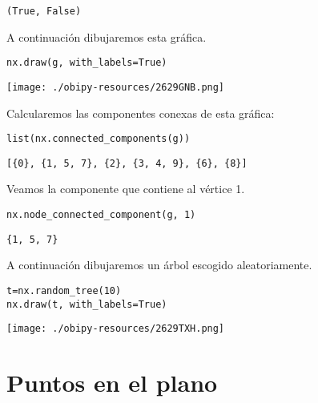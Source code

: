 \documentclass[11pt]{article}
\begin{document}
\begin{verbatim}
(True, False)
\end{verbatim}

A continuación dibujaremos esta gráfica.

\lstset{language=ipython,label= ,caption= ,captionpos=b,numbers=none}
\begin{lstlisting}
nx.draw(g, with_labels=True)
\end{lstlisting}

\begin{center}
\texttt{[image: ./obipy-resources/2629GNB.png]}
\end{center}

Calcularemos las componentes conexas de esta gráfica:

\lstset{language=ipython,label= ,caption= ,captionpos=b,numbers=none}
\begin{lstlisting}
list(nx.connected_components(g))
\end{lstlisting}

\begin{verbatim}
[{0}, {1, 5, 7}, {2}, {3, 4, 9}, {6}, {8}]
\end{verbatim}

Veamos la componente que contiene al vértice 1.

\lstset{language=ipython,label= ,caption= ,captionpos=b,numbers=none}
\begin{lstlisting}
nx.node_connected_component(g, 1)
\end{lstlisting}

\begin{verbatim}
{1, 5, 7}
\end{verbatim}

A continuación dibujaremos un árbol escogido aleatoriamente.

\lstset{language=ipython,label= ,caption= ,captionpos=b,numbers=none}
\begin{lstlisting}
t=nx.random_tree(10)
nx.draw(t, with_labels=True)
\end{lstlisting}

\begin{center}
\texttt{[image: ./obipy-resources/2629TXH.png]}
\end{center}

\section{Puntos en el plano}
\label{sec:org99d1251}
\end{document}
